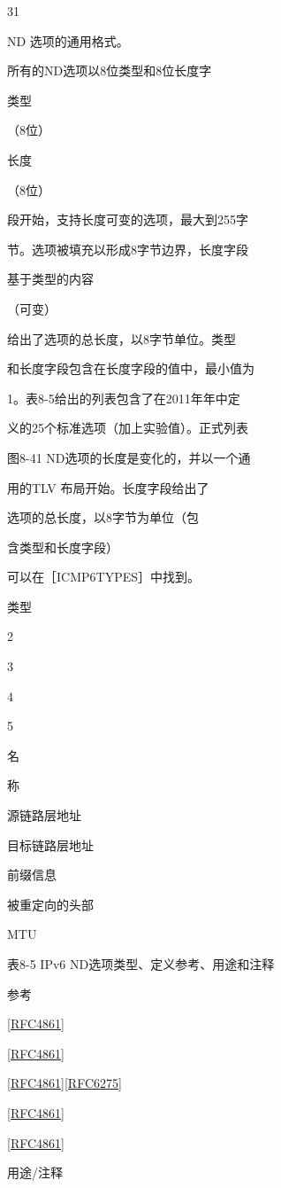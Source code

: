 31

ND 选项的通用格式。

所有的ND选项以8位类型和8位长度字

类型

（8位）

长度

（8位）

段开始，支持长度可变的选项，最大到255字

节。选项被填充以形成8字节边界，长度字段

基于类型的内容

（可变）

给出了选项的总长度，以8字节单位。类型

和长度字段包含在长度字段的值中，最小值为

1。表8-5给出的列表包含了在2011年年中定

义的25个标准选项（加上实验值）。正式列表

图8-41 ND选项的长度是变化的，并以一个通

用的TLV 布局开始。长度字段给出了

选项的总长度，以8字节为单位（包

含类型和长度字段）

可以在［ICMP6TYPES］中找到。

类型

2

3

4

5

名

称

源链路层地址

目标链路层地址

前缀信息

被重定向的头部

MTU

表8-5 IPv6 ND选项类型、定义参考、用途和注释

参考

\href{https://www.rfc-editor.org/rfc/rfc4861}{[RFC4861]}

\href{https://www.rfc-editor.org/rfc/rfc4861}{[RFC4861]}

\href{https://www.rfc-editor.org/rfc/rfc4861}{[RFC4861]}\href{https://www.rfc-editor.org/rfc/rfc6275}{[RFC6275]}

\href{https://www.rfc-editor.org/rfc/rfc4861}{[RFC4861]}

\href{https://www.rfc-editor.org/rfc/rfc4861}{[RFC4861]}

用途/注释

